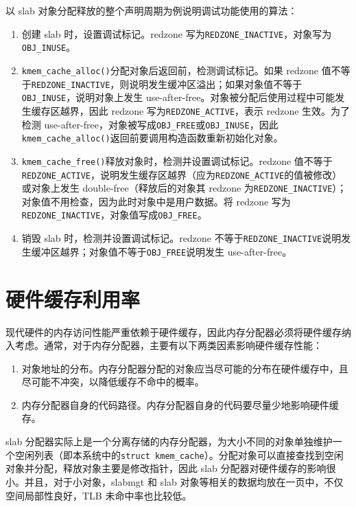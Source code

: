\documentclass[AutoFakeBold]{LZUThesis}
\begin{document}
\begin{sloppypar}
以 slab 对象分配释放的整个声明周期为例说明调试功能使用的算法：

\begin{enumerate}
\def\labelenumi{\arabic{enumi}.}
\item
  创建 slab 时，设置调试标记。redzone
  写为\texttt{REDZONE\_INACTIVE}，对象写为\texttt{OBJ\_INUSE}。
\item
  \texttt{kmem\_cache\_alloc()}分配对象后返回前，检测调试标记。如果
  redzone
  值不等于\texttt{REDZONE\_INACTIVE}，则说明发生缓冲区溢出；如果对象值不等于\texttt{OBJ\_INUSE}，说明对象上发生
  use-after-free。对象被分配后使用过程中可能发生缓存区越界，因此 redzone
  写为\texttt{REDZONE\_ACTIVE}，表示 redzone 生效。为了检测
  use-after-free，对象被写成\texttt{OBJ\_FREE}或\texttt{OBJ\_INUSE}，因此\texttt{kmem\_cache\_alloc()}返回前要调用构造函数重新初始化对象。
\item
  \texttt{kmem\_cache\_free()}释放对象时，检测并设置调试标记。redzone
  值不等于\texttt{REDZONE\_ACTIVE}，说明发生缓存区越界（应为\texttt{REDZONE\_ACTIVE}的值被修改）或对象上发生
  double-free（释放后的对象其 redzone
  为\texttt{REDZONE\_INACTIVE}）；对象值不用检查，因为此时对象中是用户数据。将
  redzone 写为\texttt{REDZONE\_INACTIVE}，对象值写成\texttt{OBJ\_FREE}。
\item
  销毁 slab 时，检测并设置调试标记。redzone
  不等于\texttt{REDZONE\_INACTIVE}说明发生缓冲区越界；对象值不等于\texttt{OBJ\_FREE}说明发生
  use-after-free。
\end{enumerate}


\section{硬件缓存利用率}\label{sec:hw-cache-efficiency}

现代硬件的内存访问性能严重依赖于硬件缓存，因此内存分配器必须将硬件缓存纳入考虑。通常，对于内存分配器，主要有以下两类因素影响硬件缓存性能：

\begin{enumerate}
\def\labelenumi{\arabic{enumi}.}
\item
  对象地址的分布。内存分配器分配的对象应当尽可能的分布在硬件缓存中，且尽可能不冲突，以降低缓存不命中的概率。
\item
  内存分配器自身的代码路径。内存分配器自身的代码要尽量少地影响硬件缓存。
\end{enumerate}

slab
分配器实际上是一个分离存储的内存分配器，为大小不同的对象单独维护一个空闲列表（即本系统中的\texttt{struct\ kmem\_cache}）。分配对象可以直接查找到空闲对象并分配，释放对象主要是修改指针，因此
slab 分配器对硬件缓存的影响很小。并且，对于小对象，slabmgt 和 slab
对象等相关的数据均放在一页中，不仅空间局部性良好，TLB 未命中率也比较低。


\end{sloppypar}
\end{document}
